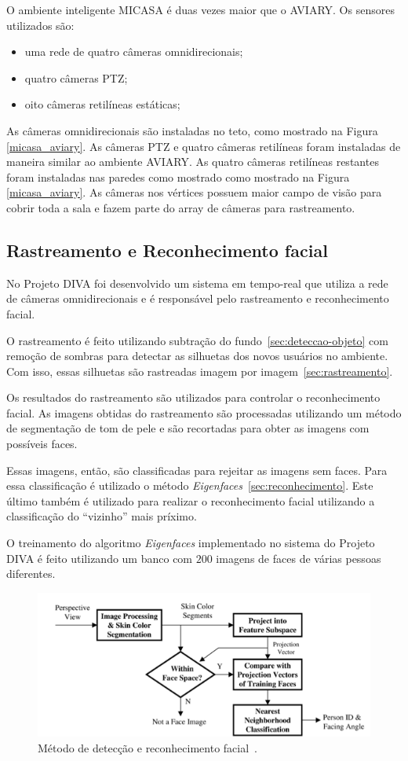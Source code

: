 O ambiente inteligente MICASA é duas vezes maior que o AVIARY. Os sensores utilizados são:
	
	\begin{itemize}
		\item uma rede de quatro câmeras omnidirecionais;
		\item quatro câmeras PTZ;
		\item oito câmeras retilíneas estáticas;
	\end{itemize}

As câmeras omnidirecionais são instaladas no teto, como mostrado na Figura \ref{micasa_aviary}. As câmeras PTZ e quatro câmeras retilíneas foram instaladas de maneira similar ao ambiente AVIARY. As quatro câmeras retilíneas restantes foram instaladas nas paredes como mostrado como mostrado na Figura \ref{micasa_aviary}. As câmeras nos vértices possuem maior campo de visão para cobrir toda a sala e fazem parte do array de câmeras para rastreamento.

\subsection{Rastreamento e Reconhecimento facial}
 
No Projeto DIVA foi desenvolvido um sistema em tempo-real que utiliza a rede de câmeras omnidirecionais e é responsável pelo rastreamento e reconhecimento facial. 

O rastreamento é feito utilizando subtração do fundo~\ref{sec:deteccao-objeto} com remoção de sombras para detectar as silhuetas dos novos usuários no ambiente.  Com isso, essas silhuetas são rastreadas imagem por imagem~\ref{sec:rastreamento}.

Os resultados do rastreamento são utilizados para controlar o reconhecimento facial. As imagens obtidas do rastreamento são processadas utilizando um método de segmentação de tom de pele e são recortadas para obter as imagens com possíveis faces. 

Essas imagens, então, são classificadas para rejeitar as imagens sem faces. Para essa classificação é utilizado o método \textit{Eigenfaces}~\ref{sec:reconhecimento}. Este último também é utilizado para realizar o reconhecimento facial utilizando a classificação do ``vizinho'' mais príximo.

O treinamento do algoritmo \textit{Eigenfaces} implementado no sistema do Projeto DIVA é feito utilizando um banco com $\displaystyle 200$ imagens de faces de várias pessoas diferentes.

	\begin{figure}[hbt]
		\begin{center}
			\includegraphics[scale=0.8]{figuras/3.TrabalhosCorrelatos/facerec.png}
		\end{center}
		\caption{Método de detecção e reconhecimento facial~\cite{trivedi}.}
		\label{facerec}
	\end{figure}

